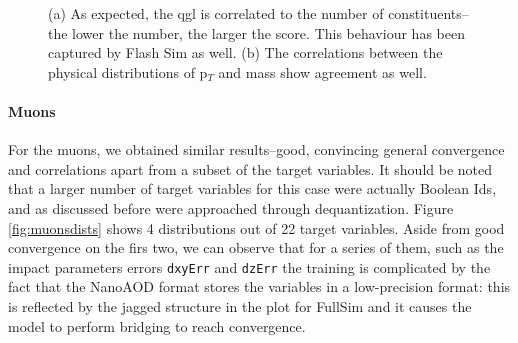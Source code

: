 \begin{figure}
    \myfloatalign
    \caption[qgl and p$_T$ correlations]{ (a) As expected, the qgl is correlated to the number of constituents--the lower the number, the larger the score. This behaviour has been captured by Flash Sim as well. (b) The correlations between the physical distributions of p$_T$ and mass show agreement as well.}\label{fig:corrjet2+3}
    
\end{figure}

\paragraph{Muons}

For the muons, we obtained similar results--good, convincing general convergence and correlations apart from a subset of the target variables. It should be noted that a larger number of target variables for this case were actually Boolean Ids, and as discussed before were approached through dequantization. Figure \ref{fig:muonsdists} shows 4 distributions out of 22 target variables. Aside from good convergence on the firs two, we can observe that for a series of them, such as the impact parameters errors \texttt{dxyErr} and \texttt{dzErr} the training is complicated by the fact that the NanoAOD format stores the variables in a low-precision format: this is reflected by the jagged structure in the plot for FullSim and it causes the model to perform bridging to reach convergence.

